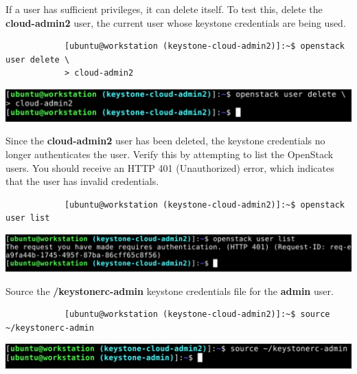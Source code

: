 \documentclass[letterpaper, 12pt]{article}
\begin{document}
\begin{enumerate}
    \begin{labstep}
        If a user has sufficient privileges, it can delete itself.
        To test this, delete the \textbf{cloud-admin2} user, the current user whose keystone credentials are being used.
        \begin{lstlisting}
            [ubuntu@workstation (keystone-cloud-admin2)]:~$ openstack user delete \
            > cloud-admin2
        \end{lstlisting}

        \begin{center}
            \includegraphics[width=\linewidth]{images/appendix/step8.png}
        \end{center}
    \end{labstep}

    \begin{labstep}
        Since the \textbf{cloud-admin2} user has been deleted, the keystone credentials no longer authenticates the user.
        Verify this by attempting to list the OpenStack users.
        You should receive an HTTP 401 (Unauthorized) error, which indicates that the user has invalid credentials.
        \begin{lstlisting}
            [ubuntu@workstation (keystone-cloud-admin2)]:~$ openstack user list
        \end{lstlisting}

        \begin{center}
            \includegraphics[width=\linewidth]{images/appendix/step9.png}
        \end{center}
    \end{labstep}

    \begin{labstep}
        Source the \textbf{\texttildemid/keystonerc-admin} keystone credentials file for the \textbf{admin} user.
        \begin{lstlisting}
            [ubuntu@workstation (keystone-cloud-admin2)]:~$ source ~/keystonerc-admin
        \end{lstlisting}

        \begin{center}
            \includegraphics[width=\linewidth]{images/appendix/step10.png}
        \end{center}
    \end{labstep}


\end{enumerate}
\end{document}
